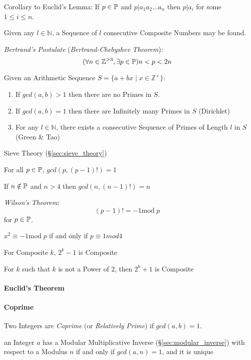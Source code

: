 Corollary to Euclid's Lemma: If $p \in \mathbb{P}$ and
$p|a_1 a_2 \ldots a_n$ then $p|a_i$ for some $1 \leq i \leq n$.

Given any $l \in \mathbb{N}$, a Sequence of $l$ consecutive Composite
Numbers may be found.

\emph{Bertrand's Postulate} (\emph{Bertrand-Chebyshev Theorem}):
\[
  (\forall n \in \mathbb{Z}^{>3}, \exists p \in \mathbb{P}) n < p < 2n
\]

Given an Arithmetic Sequence $S = \{ a + bx \;|\; x \in \mathbb{Z}^+\}$:
\begin{enumerate}
  \item If $gcd(a,b) > 1$ then there are no Primes in $S$.
  \item If $gcd(a,b) = 1$ then there are Infinitely many Primes in $S$
    (Dirichlet)
  \item For any $l \in \mathbb{N}$, there exists a consecutive
    Sequence of Primes of Length $l$ in $S$ (Green \& Tao)
\end{enumerate}

Sieve Theory (\S\ref{sec:sieve_theory})

For all $p \in \mathbb{P}$, $gcd(p, (p-1)!) = 1$

If $n \notin \mathbb{P}$ and $n > 4$ then $gcd(n,(n-1)!) = n$

\emph{Wilson's Theorem}:
\[
  (p - 1)! = -1 \mathrm{mod}\;p
\]
for $p \in \mathbb{P}$.

$x^2 \equiv -1 \mathrm{mod}\;p$ if and only if $p \equiv 1 mod 4$

For Composite $k$, $2^k-1$ is Composite

For $k$ such that $k$ is not a Power of $2$, then $2^k+1$ is Composite



\paragraph{Euclid's Theorem}\label{sec:euclids_theorem}\hfill

\paragraph{Coprime}\label{sec:coprime}\hfill

Two Integers are \emph{Coprime} (or \emph{Relatively Prime}) if $gcd (a,b) = 1$.

\fist an Integer $a$ has a Modular Multiplicative Inverse
(\S\ref{sec:modular_inverse}) with respect to a Modulus $n$ if and only if
$gcd (a, n) = 1$, and it is unique



